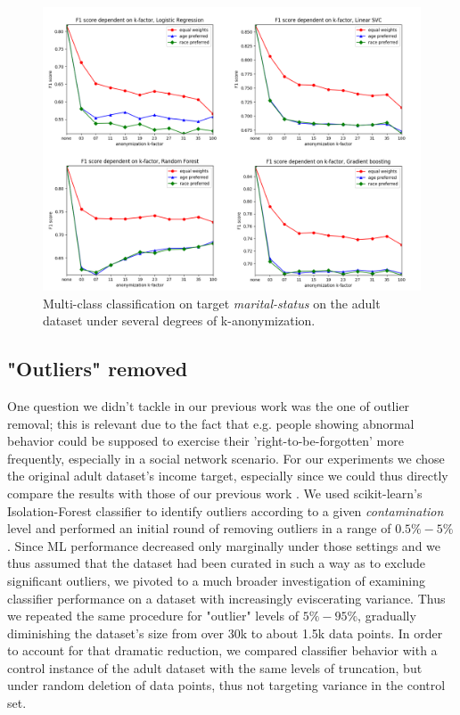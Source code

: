 \documentclass{llncs}
\begin{document}
\begin{figure}[!h]
	\centering
	\includegraphics[width=1\textwidth]{figures/anonymization/adults_marital_status/anon_marital_combined}
	\caption{Multi-class classification on target \textit{marital-status} on the adult dataset under several degrees of k-anonymization.}
	\label{fig:results_anonymization_marital_status}
\end{figure}




\subsection{"Outliers" removed}
\label{ssect:outliers_removed}

One question we didn't tackle in our previous work was the one of outlier removal; this is relevant due to the fact that e.g. people showing abnormal behavior could be supposed to exercise their 'right-to-be-forgotten' more frequently, especially in a social network scenario. For our experiments we chose the original adult dataset's income target, especially since we could thus directly compare the results with those of our previous work \cite{malle2016right}. We used scikit-learn's Isolation-Forest classifier to identify outliers according to a given \textit{contamination} level and performed an initial round of removing outliers in a range of $0.5\% - 5\%$. Since ML performance decreased only marginally under those settings and we thus assumed that the dataset had been curated in such a way as to exclude significant outliers, we pivoted to a much broader investigation of examining classifier performance on a dataset with increasingly eviscerating variance. Thus we repeated the same procedure for "outlier" levels of $5\% - 95\%$, gradually diminishing the dataset's size from over 30k to about 1.5k data points. In order to account for that dramatic reduction, we compared classifier behavior with a control instance of the adult dataset with the same levels of truncation, but under random deletion of data points, thus not targeting variance in the control set. 
\end{document}
